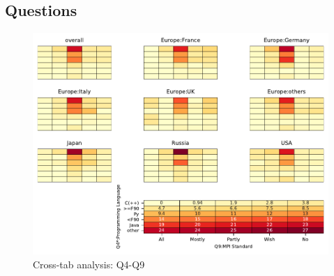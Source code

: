 
\subsection{Questions}


\begin{figure}
\begin{center}
\includegraphics[width=12cm]{../pdfs/Q4-Q9.pdf}
\caption{Cross-tab analysis: Q4-Q9}
\label{fig:Q4-Q9}
\end{center}
\end{figure}
